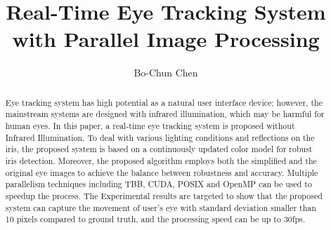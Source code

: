 \documentclass[sigconf]{acmart}
\begin{document}
%
\title{Real-Time Eye Tracking System with Parallel Image Processing}

%
\author{Bo-Chun Chen}



\renewcommand{\shortauthors}{Bo-Chun Chen}

%
\begin{abstract}
Eye tracking system has high potential as a natural user interface device;
however, the mainstream systems are designed with infrared illumination, which may be harmful for human eyes.
In this paper, a real-time eye tracking system is proposed without Infrared Illumination.
To deal with various lighting conditions and reflections on the iris, the proposed system is based on a continuously updated color model for robust iris detection. Moreover, the proposed algorithm employs both the simplified and the original eye images to achieve the balance between robustness and accuracy. Multiple parallelism techniques including TBB, CUDA, POSIX and OpenMP can be used to speedup the process. The Experimental results are targeted to show that the proposed system can capture the movement of user's eye with standard deviation smaller than 10 pixels compared to ground truth, and the processing speed can be up to 30fps.
\end{abstract}


%
\end{document}
